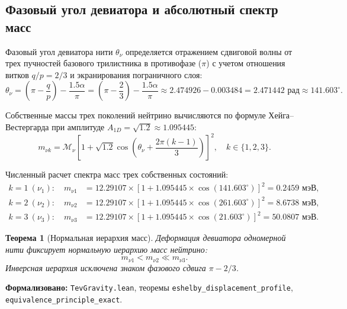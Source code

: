 \documentclass[11pt,a4paper]{article}
\newtheorem{theorem}{Теорема}
\theoremstyle{definition}
\theoremstyle{remark}
\begin{document}
\subsection{Фазовый угол девиатора и абсолютный спектр масс}
	
Фазовый угол девиатора нити $\theta_\nu$ определяется отражением сдвиговой волны от трех пучностей базового трилистника в противофазе ($\pi$) с учетом отношения витков $q/p = 2/3$ и экранирования пограничного слоя:
\begin{equation}
	\theta_\nu = \left( \pi - \frac{q}{p} \right) - \frac{1.5\alpha}{\pi} = \left( \pi - \frac{2}{3} \right) - \frac{1.5\alpha}{\pi} \approx 2.474926 - 0.003484 = 2.471442\text{ рад} \approx 141.603^\circ.
	\label{eq:neutrino_lode_angle}
\end{equation}
	
Собственные массы трех поколений нейтрино вычисляются по формуле Хейга--Вестергарда при амплитуде $A_{1D} = \sqrt{1.2} \approx 1.095445$:
\begin{equation}
	m_{\nu k} = \mathcal{M}_\nu \left[ 1 + \sqrt{1.2} \cos\left( \theta_\nu + \frac{2\pi(k-1)}{3} \right) \right]^2, \quad k \in \{1, 2, 3\}.
	\label{eq:neutrino_mass_eigenstates}
\end{equation}
	
Численный расчет спектра масс трех собственных состояний:
\begin{align}
	k=1 \ (\nu_1): \quad m_{\nu 1} &= 12.29107 \times [1 + 1.095445 \times \cos(141.603^\circ)]^2 = 0.2459\text{ мэВ}, \label{eq:m_nu1_val} \\
	k=2 \ (\nu_2): \quad m_{\nu 2} &= 12.29107 \times [1 + 1.095445 \times \cos(261.603^\circ)]^2 = 8.6738\text{ мэВ}, \label{eq:m_nu2_val} \\
	k=3 \ (\nu_3): \quad m_{\nu 3} &= 12.29107 \times [1 + 1.095445 \times \cos(21.603^\circ)]^2 = 50.0807\text{ мэВ}. \label{eq:m_nu3_val}
\end{align}
	
\begin{theorem}[Нормальная иерархия масс]
\label{thm:neutrino_normal_hierarchy}
Деформация девиатора одномерной нити фиксирует нормальную иерархию масс нейтрино:
\begin{equation}
	m_{\nu 1} < m_{\nu 2} \ll m_{\nu 3}.
	\label{eq:neutrino_hierarchy_condition}
\end{equation}
Инверсная иерархия исключена знаком фазового сдвига $\pi - 2/3$.
\end{theorem}

\noindent\small\textbf{Формализовано:} \texttt{TevGravity.lean}, теоремы \texttt{eshelby_displacement_profile}, \texttt{equivalence_principle_exact}.
\end{document}
